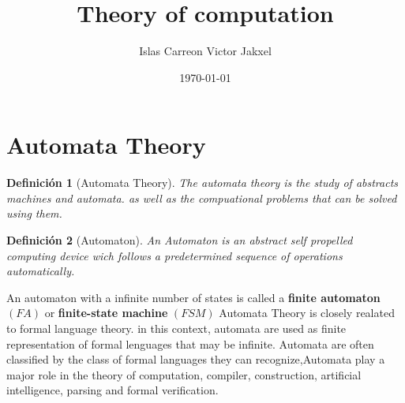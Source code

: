 \documentclass[11pt]{article}
\title{Theory of computation}
\author{Islas Carreon Victor Jakxel}
\date{\today}
\newtheorem{definition}{Definición}[section]
\begin{document}
\maketitle
\tableofcontents
\newpage

\section{Automata Theory}
\begin{definition}[Automata Theory]
  The automata theory is the study of abstracts machines and automata. as well as the compuational problems that can be solved using them.
\end{definition}
\begin{definition}[Automaton]
An Automaton is an abstract self propelled computing device wich follows a predetermined sequence of operations automatically. 
\end{definition}
An automaton with a infinite number of states is called a \textbf{finite automaton} $(FA)$ or \textbf {finite-state machine} $(FSM)$ 
Automata Theory is closely realated to formal language theory. in this context, automata are used as finite representation of formal lenguages that may be infinite. Automata are often classified by the class of formal languages they can recognize,Automata play a major role in the theory of computation, compiler, construction, artificial intelligence, parsing and formal verification. 
\end{document}

